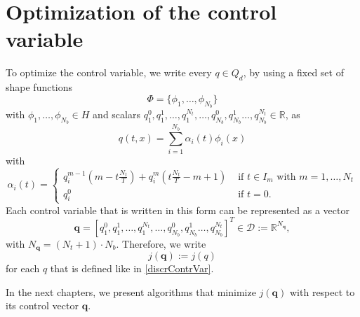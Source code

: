 \section{Optimization of the control variable}

To optimize the control variable, we write every $q\in Q_d$, by using a fixed set of shape functions
\begin{equation}
\label{basisFuncionsList}
\Phi=\{\phi_1,\dotsc,\phi_{N_b}\}
\end{equation}
 with $\phi_1,\dotsc,\phi_{N_b}\in H$ and scalars $q_1^0,q_1^1,\dotsc,q_1^{N_t},\dotsc,q_{N_b}^0,q_{N_b}^1\dotsc,q_{N_b}^{N_t}\in\mathbb{R}$, as
\begin{equation}
\label{discrContrVar}
q(t,x) = \sum_{i=1}^{N_b}\alpha_i(t)\phi_i(x)
\end{equation} 
with
\begin{displaymath}
\alpha_i(t)=\begin{cases}
q_i^{m-1}\left(m-t\frac{N_t}{T}\right) + q_i^m\left(t\frac{N_t}{T}-m+1\right) & \text{ if $t\in I_m$ with $m=1,\dotsc,N_t$}\\
q_i^0 & \text{ if $t=0$.}
\end{cases}
\end{displaymath}
Each control variable that is written in this form can be represented as a vector
\begin{displaymath}
\mathbf{q}=\left[q_1^0,q_1^1,\dotsc,q_1^{N_t},\dotsc,q_{N_b}^0,q_{N_b}^1\dotsc,q_{N_b}^{N_t}\right]^T\in\mathcal{D}:=\mathbb{R}^{N_\mathbf{q}},
\end{displaymath} 
with $N_\mathbf{q} = (N_t+1)\cdot N_b$. Therefore, we write
\begin{displaymath}
j(\mathbf{q}):=j(q)
\end{displaymath}
for each $q$ that is defined like in \eqref{discrContrVar}.

In the next chapters, we present algorithms that minimize $j(\mathbf{q})$ with respect to its control vector $\mathbf{q}$.
































































